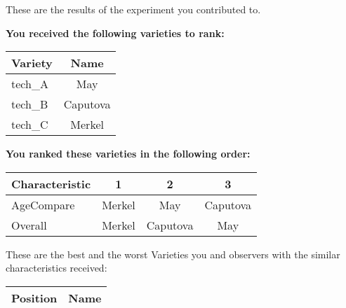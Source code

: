 \documentclass[10pt]{article}
\begin{document}
\begin{titlepage}
	These are the results of the experiment you contributed to.

	\begin{flushleft}
		\textbf{You received the following varieties to rank: }\hfill \break
		\begin{tabularx}{\textwidth}{ X | c  }
			\hline
			\textbf{Variety} & \textbf{Name} \\ \hline

			
				tech\_A & May \\ \hline
			
				tech\_B & Caputova \\ \hline
			
				tech\_C & Merkel \\ \hline
			


		\end{tabularx}\newline \newline

		\textbf{You ranked these varieties in the following order: }\hfill \break
		\begin{tabularx}{\textwidth}{ X | c | c | c  }
			\hline
			\textbf{Characteristic}
			
				& \textbf{ 1 }
			
				& \textbf{ 2 }
			
				& \textbf{ 3 }
			
			\\ \hline


			
				AgeCompare & Merkel  & May  & Caputova  \\ \hline


			
				Overall & Merkel  & Caputova  & May  \\ \hline


			

		\end{tabularx}

	\end{flushleft}

	\pagebreak

	\begin{flushleft}
		These are the best and the worst Varieties you and observers with the similar characteristics received:\hfill \break \newline
		\begin{tabularx}{\textwidth}{ X | X  }
			\hline
			\textbf{Position} & \textbf{Name} \\ \hline


\end{tabularx}
\end{flushleft}
\end{titlepage}
\end{document}
